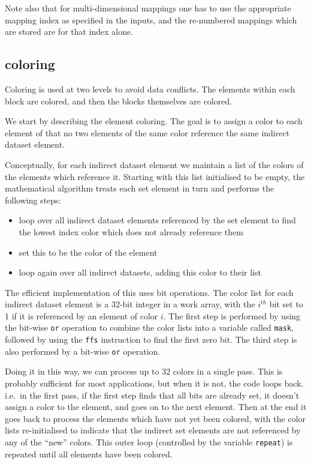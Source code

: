 \documentclass[12pt]{article}
\begin{document}
Note also that for multi-dimensional mappings one has to use the
appropriate mapping index as specified in the inputs, and the 
re-numbered mappings which are stored are for that index alone.

\newpage

\subsection{coloring}

Coloring is used at two levels to avoid data conflicts.  The 
elements within each block are colored, and then the blocks 
themselves are colored.

We start by describing the element coloring. The goal is 
to assign a color to each element of that no two elements
of the same color reference the same indirect dataset element.

Conceptually, for each indirect dataset element we maintain
a list of the colors of the elements which reference it. 
Starting with this list initialised to be empty, the mathematical
algorithm treats each set element in turn and performs the 
following steps:
\begin{itemize}
\item 
loop over all indirect dataset elements referenced by the set
element to find the lowest index color which does not already 
reference them
\item
set this to be the color of the element
\item
loop again over all indirect datasets, adding this color
to their list
\end{itemize}

The efficient implementation of this uses bit operations.
The color list for each indirect dataset element is a 
32-bit integer in a work array, with the $i^{th}$ bit set 
to 1 if it is referenced by an element of color $i$.
The first step is performed by using the bit-wise {\tt or}
operation to combine the color lists into a variable called
{\tt mask}, followed by using the {\tt ffs} instruction to 
find the first zero bit.  The third step is also performed 
by a bit-wise {\tt or} operation.

Doing it in this way, we can process up to 32 colors in a 
single pass.  This is probably sufficient for most applications, 
but when it is not, the code loops back. i.e.~in the first pass,
if the first step finds that all bits are already set, it doesn't 
assign a color to the element, and goes on to the next element.
Then at the end it goes back to process the elements which have 
not yet been colored, with the color lists re-initialised to
indicate that the indirect set elements are not referenced by 
any of the ``new'' colors.  This outer loop (controlled by the 
variable {\tt repeat}) is repeated until all elements have been 
colored.
\end{document}
